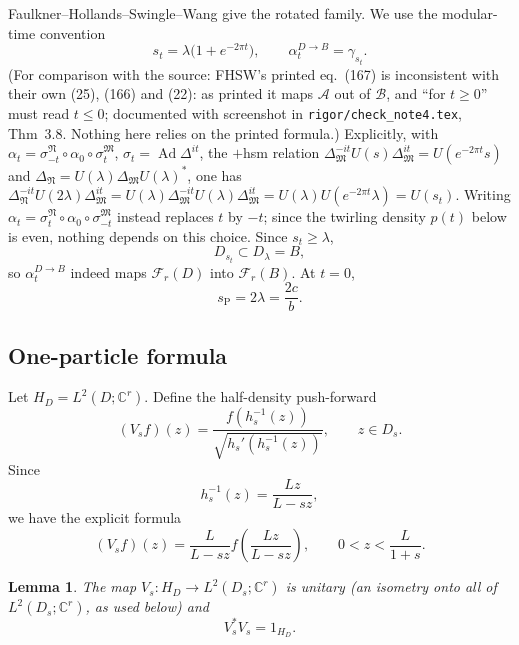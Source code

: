 \documentclass[11pt]{article}
\theoremstyle{accent}
\newtheorem{lemma}[theorem]{Lemma}
\theoremstyle{definition}
\newcommand{\cF}{\mathcal{F}}
\newcommand{\cM}{\mathfrak{M}}
\newcommand{\cN}{\mathfrak{N}}
\begin{document}
Faulkner--Hollands--Swingle--Wang give the rotated family.  We use the modular-time convention
\begin{equation}\label{eq:s-t}
 \boxed{
 s_t=\lambda\bigl(1+e^{-2\pi t}\bigr),
 \qquad
 \alpha_t^{D\to B}=\gamma_{s_t}.
 }
\end{equation}
\noindent(For comparison with the source: FHSW's printed eq.~(167) is inconsistent with their own (25), (166) and (22): as printed it maps \(\mathcal A\) out of \(\mathcal B\), and ``for \(t\ge0\)'' must read \(t\le0\); documented with screenshot in \texttt{rigor/check\_note4.tex}, Thm~3.8.  Nothing here relies on the printed formula.)
Explicitly, with \(\alpha_t=\sigma^{\cN}_{-t}\circ\alpha_0\circ\sigma^{\cM}_t\), \(\sigma_t=\operatorname{Ad}\Delta^{it}\), the \(+\)hsm relation \(\Delta_{\cM}^{-it}U(s)\Delta_{\cM}^{it}=U(e^{-2\pi t}s)\) and \(\Delta_{\cN}=U(\lambda)\Delta_{\cM}U(\lambda)^*\), one has \(\Delta_{\cN}^{-it}U(2\lambda)\Delta_{\cM}^{it}=U(\lambda)\Delta_{\cM}^{-it}U(\lambda)\Delta_{\cM}^{it}=U(\lambda)U(e^{-2\pi t}\lambda)=U(s_t)\).  Writing \(\alpha_t=\sigma^{\cN}_{t}\circ\alpha_0\circ\sigma^{\cM}_{-t}\) instead replaces \(t\) by \(-t\); since the twirling density \(p(t)\) below is even, nothing depends on this choice.  Since \(s_t\ge\lambda\),
\[
 D_{s_t}\subset D_\lambda=B,
\]
so \(\alpha_t^{D\to B}\) indeed maps \(\cF_r(D)\) into \(\cF_r(B)\).  At \(t=0\),
\begin{equation}\label{eq:s-P}
 \boxed{s_{\mathrm P}=2\lambda=\frac{2c}{b}.}
\end{equation}

\subsection{One-particle formula}

Let \(H_D=L^2(D;\mathbb C^r)\).  Define the half-density push-forward
\begin{equation}\label{eq:V-def}
 (V_sf)(z)
 =\frac{f(h_s^{-1}(z))}
 {\sqrt{h_s'(h_s^{-1}(z))}},
 \qquad z\in D_s.
\end{equation}
Since
\[
 h_s^{-1}(z)=\frac{Lz}{L-sz},
\]
we have the explicit formula
\begin{equation}\label{eq:V-explicit}
 \boxed{
 (V_sf)(z)=\frac{L}{L-sz}
 f\!\left(\frac{Lz}{L-sz}\right),
 \qquad 0<z<\frac{L}{1+s}.
 }
\end{equation}

\begin{lemma}\label{lem:V-isometry}
The map \(V_s:H_D\to L^2(D_s;\mathbb C^r)\) is unitary (an isometry onto all of \(L^2(D_s;\mathbb C^r)\), as used below) and
\[
 V_s^*V_s=1_{H_D}.
\]
\end{lemma}
\end{document}
